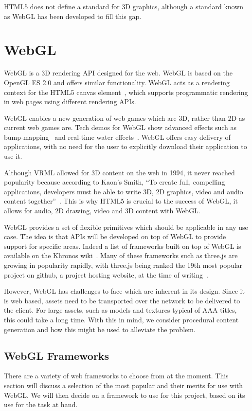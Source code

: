 HTML5 does not define a standard for 3D graphics, although a standard known as WebGL has been developed to fill this gap.

\section{WebGL}
WebGL is a 3D rendering API designed for the web.
WebGL is based on the OpenGL ES 2.0 and offers similar functionality.
WebGL acts as a rendering context for the HTML5 canvas element~\cite{web:html5canvas}, which supports programmatic rendering in web pages using different rendering APIs.

WebGL enables a new generation of web games which are 3D, rather than 2D as current web games are.
Tech demos for WebGL show advanced effects such as bump-mapping~\cite{web:webglbumpmapping} and real-time water effects~\cite{web:webglwater}.
WebGL offers easy delivery of applications, with no need for the user to explicitly download their application to use it.

Although VRML allowed for 3D content on the web in 1994, it never reached popularity because according to Kaon's Smith, ``To create full, compelling applications, developers must be able to write 3D, 2D graphics, video and audio content together''~\cite{ortiz20103d}.
This is why HTML5 is crucial to the success of WebGL, it allows for audio, 2D drawing, video and 3D content with WebGL.

WebGL provides a set of flexible primitives which should be applicable in any use case.
The idea is that APIs will be developed on top of WebGL to provide support for specific areas.
Indeed a list of frameworks built on top of WebGL is available on the Khronos wiki~\cite{web:webglframeworks}.
Many of these frameworks such as three.js are growing in popularity rapidly, with three.js being ranked the 19th most popular project on github, a project hosting website, at the time of writing~\cite{web:githubranks}.

However, WebGL has challenges to face which are inherent in its design.
Since it is web based, assets need to be transported over the network to be delivered to the client.
For large assets, such as models and textures typical of AAA titles, this could take a long time.
With this in mind, we consider procedural content generation and how this might be used to alleviate the problem.

\subsection{WebGL Frameworks}
There are a variety of web frameworks to choose from at the moment.
This section will discuss a selection of the most popular and their merits for use with WebGL.
We will then decide on a framework to use for this project, based on its use for the task at hand.

